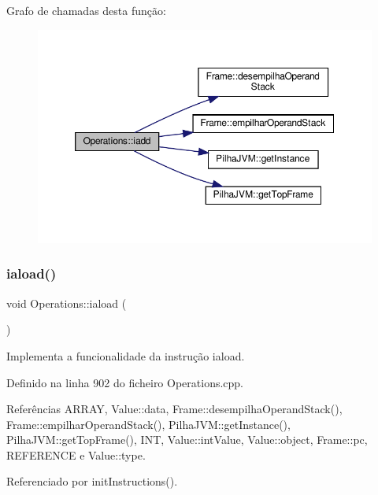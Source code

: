 Grafo de chamadas desta função\+:\nopagebreak
\begin{figure}[H]
\begin{center}
\leavevmode
\includegraphics[width=350pt]{classOperations_a12d5933f0d0c91c578b76edb1971a2be_cgraph}
\end{center}
\end{figure}
\mbox{\label{classOperations_a77f3b4c161fee7fbd6bb89b170400c0c}} 
\subsubsection{\texorpdfstring{iaload()}{iaload()}}
{\footnotesize\ttfamily void Operations\+::iaload (\begin{DoxyParamCaption}{ }\end{DoxyParamCaption})\hspace{0.3cm}{\ttfamily [private]}}



Implementa a funcionalidade da instrução iaload. 



Definido na linha 902 do ficheiro Operations.\+cpp.



Referências A\+R\+R\+AY, Value\+::data, Frame\+::desempilha\+Operand\+Stack(), Frame\+::empilhar\+Operand\+Stack(), Pilha\+J\+V\+M\+::get\+Instance(), Pilha\+J\+V\+M\+::get\+Top\+Frame(), I\+NT, Value\+::int\+Value, Value\+::object, Frame\+::pc, R\+E\+F\+E\+R\+E\+N\+CE e Value\+::type.



Referenciado por init\+Instructions().

